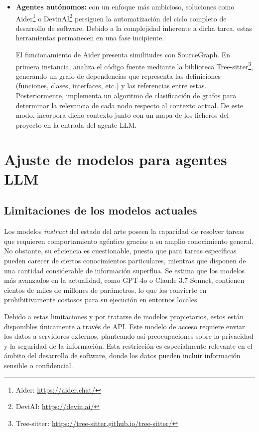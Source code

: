 \begin{itemize}
\item {\textbf{Agentes autónomos:}} con un enfoque más ambicioso, soluciones como Aider\footnote{Aider: \url{https://aider.chat/}} o DevinAI\footnote{DeviAI: \url{https://devin.ai/}} persiguen la automatización del ciclo completo de desarrollo de software. Debido a la complejidad inherente a dicha tarea, estas herramientas permanecen en una fase incipiente\cite{acharya_devin_2025}.

  El funcionamiento de Aider presenta similitudes con SourceGraph\cite{noauthor_building_2023}. En primera instancia, analiza el código fuente mediante la biblioteca Tree-sitter\footnote{Tree-sitter: \url{https://tree-sitter.github.io/tree-sitter/}}, generando un grafo de dependencias que representa las definiciones (funciones, clases, interfaces, etc.) y las referencias entre estas. Posteriormente, implementa un algoritmo de clasificación de grafos para determinar la relevancia de cada nodo respecto al contexto actual. De este modo, incorpora dicho contexto junto con un mapa de los ficheros del proyecto en la entrada del agente LLM.  

\end{itemize}

\section{Ajuste de modelos para agentes LLM}
\subsection{Limitaciones de los modelos actuales}
Los modelos \textit{instruct} del estado del arte poseen la capacidad de resolver tareas que requieren comportamiento agéntico gracias a su amplio conocimiento general. No obstante, su eficiencia es cuestionable, puesto que para tareas específicas pueden carecer de ciertos conocimientos particulares, mientras que disponen de una cantidad considerable de información superflua. Se estima que los modelos más avanzados en la actualidad, como GPT-4o o Claude 3.7 Sonnet, contienen cientos de miles de millones de parámetros\cite{noauthor_number_2024}, lo que los convierte en prohibitivamente costosos para su ejecución en entornos locales.

Debido a estas limitaciones y por tratarse de modelos propietarios, estos están disponibles únicamente a través de API. Este modelo de acceso requiere enviar los datos a servidores externos, planteando así preocupaciones sobre la privacidad y la seguridad de la información. Esta restricción es especialmente relevante en el ámbito del desarrollo de software, donde los datos pueden incluir información sensible o confidencial.

